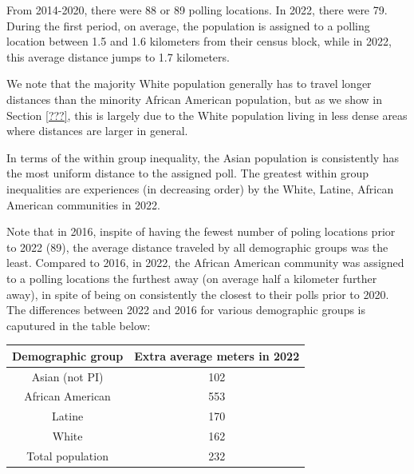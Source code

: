 \documentclass[11pt]{article}
\theoremstyle{remark}
\theoremstyle{definition}
\begin{document}
From 2014-2020, there were 88 or 89 polling locations. In 2022, there were 79. During the first period, on average, the population is assigned to a polling location between 1.5 and 1.6 kilometers from their census block, while in 2022, this average distance jumps to 1.7 kilometers. 

We note that the majority White population generally has to travel longer distances than the minority African American population, but as we show in Section \ref{???}, this is largely due to the White population living in less dense areas where distances are larger in general. 

In terms of the within group inequality, the Asian population is consistently has the most uniform distance to the assigned poll. The greatest within group inequalities are experiences (in decreasing order) by the White, Latine, African American communities in 2022.

Note that in 2016, inspite of having the fewest number of poling locations prior to 2022 (89), the average distance traveled by all demographic groups was the least. Compared to 2016, in 2022, the African American community was assigned to a polling locations the furthest away (on average half a kilometer further away), in spite of being on consistently the closest to their polls prior to 2020. The differences between 2022 and 2016 for various demographic groups is caputured in the table below:

\begin{tabular}{|c|c|}
	\hline
	Demographic group & Extra average meters in 2022 \\ \hline
	Asian (not PI) &   102 \\ \hline
	African American &   553  \\ \hline
	Latine & 170 \\ \hline
	White &  162\\ \hline
	Total population &  232\\ \hline
\end{tabular}
	
\end{document}
